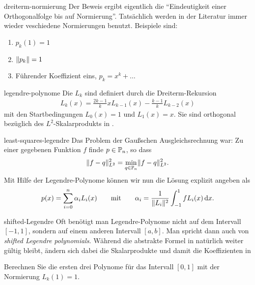 \begin{Bemerkung}{dreiterm-normierung}
  Der Beweis ergibt eigentlich die ``Eindeutigkeit einer
  Orthogonalfolge bis auf Normierung''. Tatsächlich werden in der
  Literatur immer wieder veschiedene Normierungen benutzt. Beispiele
  sind:
  \begin{enumerate}
  \item $p_k(1) = 1$
  \item $\norm{p_k} = 1$
  \item Führender Koeffizient eins, $p_k = x^k + \dots$
  \end{enumerate}
\end{Bemerkung}

\begin{Definition}{legendre-polynome}
  Die  $L_k$ sind definiert durch
  die Dreiterm-Rekursion
  \begin{gather}
    L_{k}(x) = \tfrac{2k-1}{k}x L_{k-1}(x) - \tfrac{k-1}{k} L_{k-2}(x)
  \end{gather}
  mit den Startbedingungen $L_0(x) = 1$ und $L_1(x) = x$.
  Sie sind orthogonal bezüglich des $L^2$-Skalarprodukts in
  .
\end{Definition}

\begin{Beispiel}{least-squares-legendre}
  Das Problem der Gaußschen Ausgleichsrechnung war: Zu einer gegebenen
  Funktion $f$ finde $p\in \P_n$, so dass
  \begin{gather}
    \norm{f-q}_{L^2}^2
    = \min_{q\in\P_n} \norm{f-q}_{L^2}^2.
  \end{gather}
  Mit Hilfe der Legendre-Polynome können wir nun die Lösung explizit angeben als
  \begin{gather}
    p(x) = \sum_{i=0}^n \alpha_i L_i(x)
    \qquad\text{mit}\qquad
    \alpha_i = \frac1{\norm{L_i}^2}\int_{-1}^1 f L_i(x)\dx.
  \end{gather}
\end{Beispiel}

\begin{Aufgabe}{shifted-Legendre}
  Oft benötigt man Legendre-Polynome nicht auf dem Intervall $[-1,1]$,
  sondern auf einem anderen Intervall $[a,b]$. Man spricht dann auch
  von \emph{shifted Legendre polynomials}. Während die abstrakte
  Formel in  natürlich weiter gültig bleibt,
  ändern sich dabei die Skalarprodukte und damit die Koeffizienten in

  Berechnen Sie die ersten drei Polynome für das Intervall $[0,1]$ mit
  der Normierung $L_k(1) = 1$.
\end{Aufgabe}

